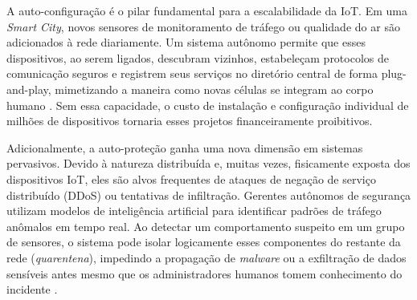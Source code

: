 A auto-configuração é o pilar fundamental para a escalabilidade da IoT. Em uma \textit{Smart City}, novos sensores de monitoramento de tráfego ou qualidade do ar são adicionados à rede diariamente. Um sistema autônomo permite que esses dispositivos, ao serem ligados, descubram vizinhos, estabeleçam protocolos de comunicação seguros e registrem seus serviços no diretório central de forma plug-and-play, mimetizando a maneira como novas células se integram ao corpo humano \cite{kephart2003}. Sem essa capacidade, o custo de instalação e configuração individual de milhões de dispositivos tornaria esses projetos financeiramente proibitivos.

Adicionalmente, a auto-proteção ganha uma nova dimensão em sistemas pervasivos. Devido à natureza distribuída e, muitas vezes, fisicamente exposta dos dispositivos IoT, eles são alvos frequentes de ataques de negação de serviço distribuído (DDoS) ou tentativas de infiltração. Gerentes autônomos de segurança utilizam modelos de inteligência artificial para identificar padrões de tráfego anômalos em tempo real. Ao detectar um comportamento suspeito em um grupo de sensores, o sistema pode isolar logicamente esses componentes do restante da rede (\textit{quarentena}), impedindo a propagação de \textit{malware} ou a exfiltração de dados sensíveis antes mesmo que os administradores humanos tomem conhecimento do incidente \cite{lalanda2013}.